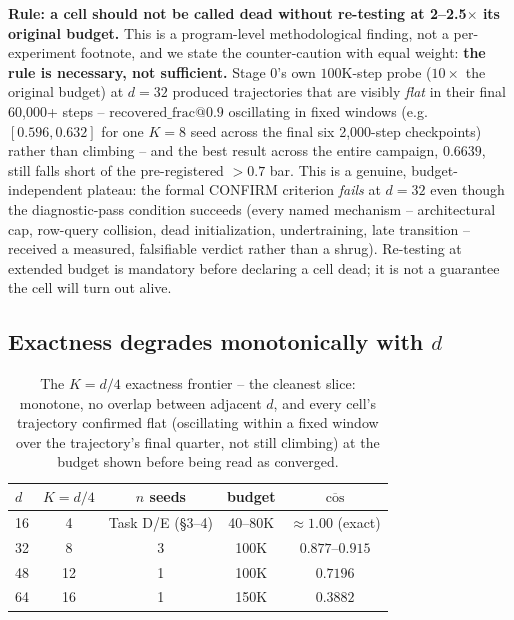 \textbf{Rule: a cell should not be called dead without re-testing at
2--2.5$\times$ its original budget.} This is a program-level methodological
finding, not a per-experiment footnote, and we state the counter-caution
with equal weight: \textbf{the rule is necessary, not sufficient.} Stage
0's own $100$K-step probe ($10\times$ the original budget) at $d{=}32$
produced trajectories that are visibly \emph{flat} in their final
60{,}000+ steps -- $\mathrm{recovered\_frac@0.9}$ oscillating in fixed
windows (e.g.\ $[0.596,0.632]$ for one $K{=}8$ seed across the final six
2{,}000-step checkpoints) rather than climbing -- and the best result
across the entire campaign, $0.6639$, still falls short of the
pre-registered $>0.7$ bar. This is a genuine, budget-independent plateau:
the formal CONFIRM criterion \emph{fails} at $d{=}32$ even though the
diagnostic-pass condition succeeds (every named mechanism -- architectural
cap, row-query collision, dead initialization, undertraining, late
transition -- received a measured, falsifiable verdict rather than a
shrug). Re-testing at extended budget is mandatory before declaring a cell
dead; it is not a guarantee the cell will turn out alive.

\subsection{Exactness degrades monotonically with $d$}
\label{sec:frontier-table}

\begin{table}[t]
\centering
\small
\setlength{\tabcolsep}{3.5pt}
\begin{tabular}{lcccc}
\toprule
$d$ & $K{=}d/4$ & $n$ seeds & budget & $\overline{\cos}$ \\
\midrule
16 & 4  & Task D/E (\S3--4)     & 40--80K & $\approx1.00$ (exact) \\
32 & 8  & 3                     & 100K & $0.877$--$0.915$ \\
48 & 12 & 1                     & 100K & $0.7196$ \\
64 & 16 & 1                     & 150K & $0.3882$ \\
\bottomrule
\end{tabular}
\caption{The $K{=}d/4$ exactness frontier -- the cleanest slice: monotone,
no overlap between adjacent $d$, and every cell's trajectory confirmed flat
(oscillating within a fixed window over the trajectory's final quarter,
not still climbing) at the budget shown before being read as converged.}
\label{tab:frontier-d4}
\end{table}

